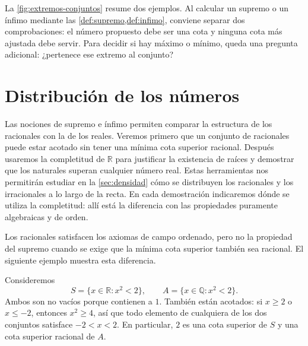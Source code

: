 La \cref{fig:extremos-conjuntos} resume dos ejemplos. Al calcular un supremo o un ínfimo mediante las \cref{def:supremo,def:infimo}, conviene separar dos comprobaciones: el número propuesto debe ser una cota y ninguna cota más ajustada debe servir. Para decidir si hay máximo o mínimo, queda una pregunta adicional: ¿pertenece ese extremo al conjunto?

\section{Distribución de los números}
\label{sec:distribucion-numeros}

Las nociones de supremo e ínfimo permiten comparar la estructura de los racionales con la de los reales. Veremos primero que un conjunto de racionales puede estar acotado sin tener una mínima cota superior racional. Después usaremos la completitud de $\mathbb{R}$ para justificar la existencia de raíces y demostrar que los naturales superan cualquier número real. Estas herramientas nos permitirán estudiar en la \cref{sec:densidad} cómo se distribuyen los racionales y los irracionales a lo largo de la recta. En cada demostración indicaremos dónde se utiliza la completitud: allí está la diferencia con las propiedades puramente algebraicas y de orden.

Los racionales satisfacen los axiomas de campo ordenado, pero no la propiedad del supremo cuando se exige que la mínima cota superior también sea racional. El siguiente ejemplo muestra esta diferencia.

\begin{example}
Consideremos
\[
 S=\{x\in\mathbb{R}:x^2<2\},
 \qquad
 A=\{x\in\mathbb{Q}:x^2<2\}.
\]
Ambos son no vacíos porque contienen a $1$. También están acotados: si $x\geq2$ o $x\leq-2$, entonces $x^2\geq4$, así que todo elemento de cualquiera de los dos conjuntos satisface $-2<x<2$. En particular, $2$ es una cota superior de $S$ y una cota superior racional de $A$.
\end{example}

